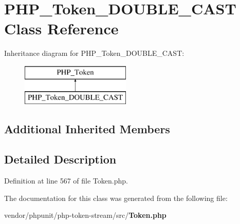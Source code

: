 \section{P\+H\+P\+\_\+\+Token\+\_\+\+D\+O\+U\+B\+L\+E\+\_\+\+C\+A\+S\+T Class Reference}
\label{class_p_h_p___token___d_o_u_b_l_e___c_a_s_t}
Inheritance diagram for P\+H\+P\+\_\+\+Token\+\_\+\+D\+O\+U\+B\+L\+E\+\_\+\+C\+A\+S\+T\+:\begin{figure}[H]
\begin{center}
\leavevmode
\includegraphics[height=2.000000cm]{class_p_h_p___token___d_o_u_b_l_e___c_a_s_t}
\end{center}
\end{figure}
\subsection*{Additional Inherited Members}


\subsection{Detailed Description}


Definition at line 567 of file Token.\+php.



The documentation for this class was generated from the following file\+:\begin{DoxyCompactItemize}
\item 
vendor/phpunit/php-\/token-\/stream/src/{\bf Token.\+php}\end{DoxyCompactItemize}
